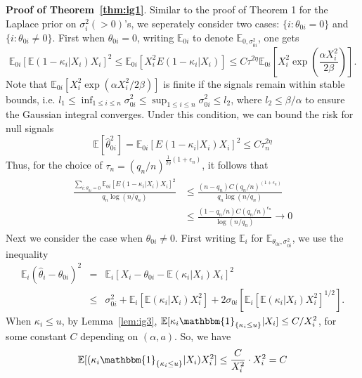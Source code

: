 \documentclass[sn-basic]{sn-jnl}%
\theoremstyle{thmstyleone}%
\begin{document}
\noindent
\textbf{Proof of Theorem~\ref{thm:ig1}}. Similar to the proof of Theorem 1 for the Laplace prior on $\sigma_i^2 (>0)$'s, we seperately consider two cases: $\{i:\theta_{0i}=0\}$ and $\{i:\theta_{0i}\neq 0\}$. First when $\theta_{0i}=0$, writing
$\mathbb{E}_{0i}$ to denote $\mathbb{E}_{0,\sigma_{0i}^2}$, one gets
\begin{equation}
\mathbb{E}_{0i}[\mathbb{E}(1-\kappa_i|X_i)X_i]^2 \leq \mathbb{E}_{0i}[X_i^2E(1-\kappa_i|X_i)]
\leq C\tau^{2\eta} \mathbb{E}_{0i}[X_i^2\exp(\frac{\alpha X_i^2}{2\beta})].
\label{eq:t1-ig-1}
\end{equation}
\noindent
Note that $\mathbb{E}_{0i}[X_i^2\exp(\alpha X_i^2/2\beta)]$ is finite if the signals remain within stable bounds, i.e. $l_1 \leq \inf_{1 \leq i \leq n} \sigma_{0i}^2 \leq \sup_{1 \leq i \leq n} \sigma_{0i}^2 \leq l_2$, where $l_2 \leq \beta/\alpha$ to ensure the Gaussian integral converges. Under this condition, we can bound the risk for null signals
\begin{equation}
\mathbb{E}[\hat\theta_{0i}^2] = \mathbb{E}_{0i}[E(1-\kappa_i|X_i)X_i]^2 \leq C\tau_n^{2\eta}
\label{eq:t1-ig-2}
\end{equation}
Thus, for the choice of $\tau_n = (q_n/n)^{\frac{1}{2\eta}(1+\epsilon_n)}$, it follows that
\begin{eqnarray}
\begin{aligned}
\frac{\sum\limits_{i: \theta_{0i}=0} \mathbb{E}_{0i}[E(1-\kappa_i|X_i)X_i]^2}{q_n \log (n/q_n)}
&\leq \frac{(n-q_n) C (q_n/n)^{(1+\epsilon_n)}}{q_n \log (n/q_n)} \\
&\leq \frac{(1-q_n/n) C (q_n/n)^{\epsilon_n}}{\log (n/q_n)}
\to 0
\label{eq:t1-ig-3}
\end{aligned}
\end{eqnarray}
\noindent
Next we consider the case when $\theta_{0i}\neq 0$. First writing $\mathbb{E}_i$ for $\mathbb{E}_{\theta_{0i},\sigma_{0i}^2}$, we use the inequality
\begin{eqnarray}
\mathbb{E}_i(\hat{\theta}_i-\theta_{0i})^2
&=&
\mathbb{E}_i[X_i-\theta_{0i} - \mathbb{E}(\kappa_i|X_i)X_i]^2 \nonumber \\
&\leq&
\sigma_{0i}^2 + \mathbb{E}_i[\mathbb{E}(\kappa_i|X_i)X_i^2] + 2\sigma_{0i}[\mathbb{E}_i[\mathbb{E}(\kappa_i|X_i)X_i^2]^{1/2}].
\label{eq:t1-ig-4}
\end{eqnarray}
\noindent
When $\kappa_i \leq u$, by Lemma~\ref{lem:ig3}, $\mathbb{E}[\kappa_i \mathbbm{1}_{\{ \kappa_i \leq u \}}|X_i] \leq C/X_i^2$, for some constant $C$ depending on $(\alpha, a)$. So, we have
\begin{equation}
\mathbb{E}[(\kappa_i \mathbbm{1}_{\{ \kappa_i \leq u \}}|X_i)X_i^2] \leq \frac{C}{X_i^2} \cdot X_i^2 = C
\label{eq:t1-ig-5}
\end{equation}
\end{document}
